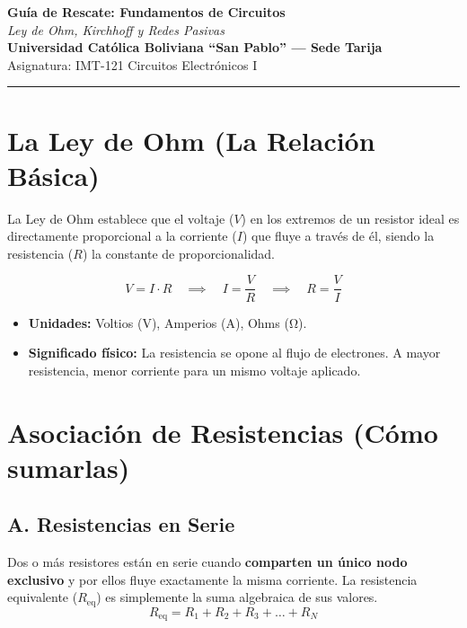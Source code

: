 \documentclass[11pt, a4paper]{article}
\begin{document}
\begin{center}
    \vspace*{0.2cm}
    {\LARGE \textbf{Guía de Rescate: Fundamentos de Circuitos}} \\[0.3cm]
    {\Large \textit{Ley de Ohm, Kirchhoff y Redes Pasivas}} \\[0.5cm]
    \normalsize
    \textbf{Universidad Católica Boliviana ``San Pablo'' — Sede Tarija} \\
    Asignatura: IMT-121 Circuitos Electrónicos I
    \vspace{0.4cm}
\end{center}

\hrule
\vspace{0.6cm}

\section{La Ley de Ohm (La Relación Básica)}
La Ley de Ohm establece que el voltaje ($V$) en los extremos de un resistor ideal es directamente proporcional a la corriente ($I$) que fluye a través de él, siendo la resistencia ($R$) la constante de proporcionalidad.

\begin{equation}
    V = I \cdot R \quad \implies \quad I = \frac{V}{R} \quad \implies \quad R = \frac{V}{I}
\end{equation}

\begin{itemize}[label=\textcolor{ucbblue}{\textbullet}]
    \item \textbf{Unidades:} Voltios (\unit{\volt}), Amperios (\unit{\ampere}), Ohms (\unit{\ohm}).
    \item \textbf{Significado físico:} La resistencia se opone al flujo de electrones. A mayor resistencia, menor corriente para un mismo voltaje aplicado.
\end{itemize}

\section{Asociación de Resistencias (Cómo sumarlas)}

\subsection*{A. Resistencias en Serie}
Dos o más resistores están en serie cuando \textbf{comparten un único nodo exclusivo} y por ellos fluye exactamente la misma corriente. La resistencia equivalente ($R_{\text{eq}}$) es simplemente la suma algebraica de sus valores.
\begin{equation}
    R_{\text{eq}} = R_1 + R_2 + R_3 + \dots + R_N
\end{equation}
\end{document}
